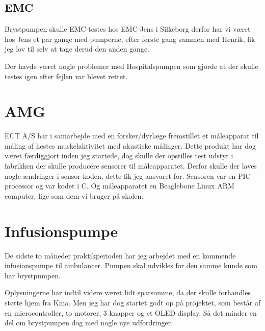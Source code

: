 \subsection{EMC}

Brystpumpen skulle EMC-testes hos EMC-Jens i Silkeborg derfor har vi været hos Jens et par gange med pumperne, efter første gang sammen med Henrik, fik jeg lov til selv at tage derud den anden gange.

Der havde været nogle problemer med Hospitalspumpen som gjorde at der skulle testes igen efter fejlen var blevet rettet.

\section{AMG}

ECT A/S har i samarbejde med en forsker/dyrlæge fremstillet et måleapparat til måling af hestes muskelaktivitet med akustiske målinger. Dette produkt har dog været færdiggjort inden jeg startede, dog skulle der opstilles test udstyr i fabrikken der skulle producere sensorer til måleapparatet. Derfor skulle der laves nogle ændringer i sensor-koden, dette fik jeg ansvaret for. Sensoren var en PIC processor og var kodet i C. Og måleapparatet en Beaglebone Linux ARM computer, lige som dem vi bruger på skolen. 

\section{Infusionspumpe}

De sidste to måneder praktikperioden har jeg arbejdet med en kommende infusionspumpe til ambulancer. Pumpen skal udvikles for den samme kunde som har brystpumpen.

Oplysningerne har indtil videre været lidt sparsomme, da der skulle forhandles støtte hjem fra Kina. Men jeg har dog startet godt op på projektet, som består af en microcontroller, to motorer, 3 knapper og et OLED display. Så det minder en del om brystpumpen dog med nogle nye udfordringer.
